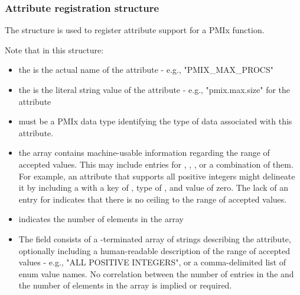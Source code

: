 \subsubsection{Attribute registration structure}

The  structure is used to register attribute support for a \ac{PMIx} function.


Note that in this structure:

\begin{itemize}
    \item the  is the actual name of the attribute - e.g., "PMIX_MAX_PROCS"
    \item the  is the literal string value of the attribute - e.g., "pmix.max.size" for the  attribute
    \item {} must be a \ac{PMIx} data type identifying the type of data associated with this attribute.
    \item the  array contains machine-usable information regarding the range of accepted values. This may include entries for , , , or a combination of them. For example, an attribute that supports all positive integers might delineate it by including a  with a key of , type of , and value of zero. The lack of an entry for  indicates that there is no ceiling to the range of accepted values.
    \item {} indicates the number of elements in the  array
    \item The  field consists of a -terminated array of strings describing the attribute, optionally including a human-readable description of the range of accepted values - e.g., "ALL POSITIVE INTEGERS", or a comma-delimited list of enum value names. No correlation between the number of entries in the  and the number of elements in the  array is implied or required.
\end{itemize}

